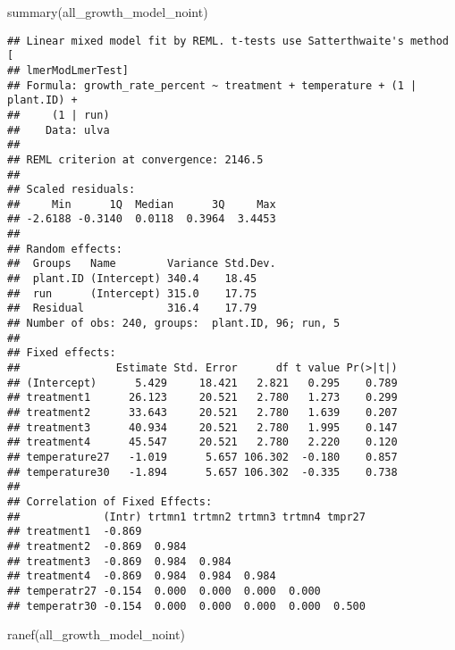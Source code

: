 \documentclass[
]{article}
\newenvironment{Shaded}{\begin{snugshade}}{\end{snugshade}}
\newcommand{\FunctionTok}[1]{\textcolor[rgb]{0.00,0.00,0.00}{#1}}
\newcommand{\NormalTok}[1]{#1}
\begin{document}
\begin{Shaded}
\begin{Highlighting}[]
\FunctionTok{summary}\NormalTok{(all\_growth\_model\_noint)}
\end{Highlighting}
\end{Shaded}

\begin{verbatim}
## Linear mixed model fit by REML. t-tests use Satterthwaite's method [
## lmerModLmerTest]
## Formula: growth_rate_percent ~ treatment + temperature + (1 | plant.ID) +  
##     (1 | run)
##    Data: ulva
## 
## REML criterion at convergence: 2146.5
## 
## Scaled residuals: 
##     Min      1Q  Median      3Q     Max 
## -2.6188 -0.3140  0.0118  0.3964  3.4453 
## 
## Random effects:
##  Groups   Name        Variance Std.Dev.
##  plant.ID (Intercept) 340.4    18.45   
##  run      (Intercept) 315.0    17.75   
##  Residual             316.4    17.79   
## Number of obs: 240, groups:  plant.ID, 96; run, 5
## 
## Fixed effects:
##               Estimate Std. Error      df t value Pr(>|t|)
## (Intercept)      5.429     18.421   2.821   0.295    0.789
## treatment1      26.123     20.521   2.780   1.273    0.299
## treatment2      33.643     20.521   2.780   1.639    0.207
## treatment3      40.934     20.521   2.780   1.995    0.147
## treatment4      45.547     20.521   2.780   2.220    0.120
## temperature27   -1.019      5.657 106.302  -0.180    0.857
## temperature30   -1.894      5.657 106.302  -0.335    0.738
## 
## Correlation of Fixed Effects:
##             (Intr) trtmn1 trtmn2 trtmn3 trtmn4 tmpr27
## treatment1  -0.869                                   
## treatment2  -0.869  0.984                            
## treatment3  -0.869  0.984  0.984                     
## treatment4  -0.869  0.984  0.984  0.984              
## temperatr27 -0.154  0.000  0.000  0.000  0.000       
## temperatr30 -0.154  0.000  0.000  0.000  0.000  0.500
\end{verbatim}

\begin{Shaded}
\begin{Highlighting}[]
\FunctionTok{ranef}\NormalTok{(all\_growth\_model\_noint)}
\end{Highlighting}
\end{Shaded}
\end{document}
